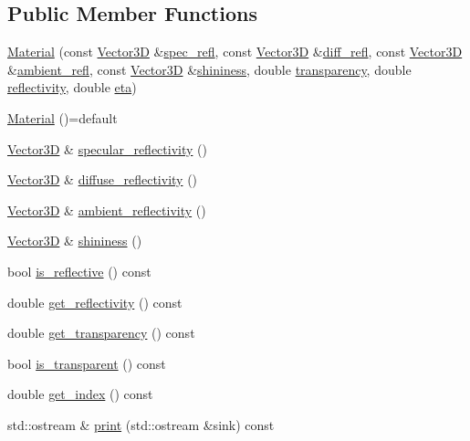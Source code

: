 \subsection*{Public Member Functions}
\begin{DoxyCompactItemize}
\item 
\hyperlink{classMaterial_a4e63e7e70f9a2cc55801f798d88f5c14}{Material} (const \hyperlink{classVector3D}{Vector3D} \&\hyperlink{classMaterial_a8b1858703e3298ba1cc705684939f953}{spec\+\_\+refl}, const \hyperlink{classVector3D}{Vector3D} \&\hyperlink{classMaterial_af53038fbe5bbe5d1a9801aabc97543a5}{diff\+\_\+refl}, const \hyperlink{classVector3D}{Vector3D} \&\hyperlink{classMaterial_a40002cba7c7049feb2bddaf57ae96ba4}{ambient\+\_\+refl}, const \hyperlink{classVector3D}{Vector3D} \&\hyperlink{classMaterial_abd4573ad64b9e4ebc7d3a365e2078d69}{shininess}, double \hyperlink{classMaterial_a02abe03436775e128e04e1c737d34067}{transparency}, double \hyperlink{classMaterial_a050f60e6002271e571c4e5afc4b097b5}{reflectivity}, double \hyperlink{classMaterial_a62e8368c76c975790315b16d97558c26}{eta})
\item 
\hyperlink{classMaterial_a6059ec72855855b11672ff25962e9336}{Material} ()=default
\item 
\hyperlink{classVector3D}{Vector3D} \& \hyperlink{classMaterial_a927c720ad76f97c4619dca4a1b609b26}{specular\+\_\+reflectivity} ()
\item 
\hyperlink{classVector3D}{Vector3D} \& \hyperlink{classMaterial_a3f4ff9c259e67dcffa2d607f788fd2a1}{diffuse\+\_\+reflectivity} ()
\item 
\hyperlink{classVector3D}{Vector3D} \& \hyperlink{classMaterial_a2b80ada55bf639ce99daa45f8c94bfc6}{ambient\+\_\+reflectivity} ()
\item 
\hyperlink{classVector3D}{Vector3D} \& \hyperlink{classMaterial_abd4573ad64b9e4ebc7d3a365e2078d69}{shininess} ()
\item 
bool \hyperlink{classMaterial_abec78805fbfef252c880c2208c5c26be}{is\+\_\+reflective} () const 
\item 
double \hyperlink{classMaterial_a29eeea5a383619c64e2014ea44962911}{get\+\_\+reflectivity} () const 
\item 
double \hyperlink{classMaterial_a55764b81a00d8908593c9cf7caec655a}{get\+\_\+transparency} () const 
\item 
bool \hyperlink{classMaterial_acf9c74cabb160d0e8e6445ae3f39d3b9}{is\+\_\+transparent} () const 
\item 
double \hyperlink{classMaterial_a1f580e086d0775df267fa4c791713834}{get\+\_\+index} () const 
\item 
std\+::ostream \& \hyperlink{classMaterial_a9b45a3e49fbc8e4eb7ba30839ed6d593}{print} (std\+::ostream \&sink) const 
\end{DoxyCompactItemize}
